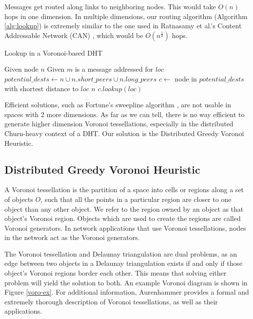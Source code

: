 Messages get routed along links to neighboring nodes.
This would take $O(n)$ hops in one dimension.
In multiple dimensions, our routing algorithm (Algorithm \ref{alg:lookup}) is extremely similar to the one used in Ratnasamy et al.'s Content Addressable Network (CAN) \cite{can}, which would be $O(n^{\frac{1}{d}})$ hops.


\begin{algorithm}
	\caption{Lookup in a Voronoi-based DHT}
	\label{alg:lookup}
	\begin{algorithmic}[1]
		\State Given node $n$
		\State Given $m$ is a message addressed for $loc$
		\State $potential\_dests \leftarrow n \cup n.short\_peers \cup n.long\_peers$
		\State $c \leftarrow $ node in $ potential\_dests$ with shortest distance to $loc$
			\State \Return $n$
		\Else
			\State \Return $c.lookup(loc)$
		\EndIf
	\end{algorithmic}
\end{algorithm}


Efficient solutions, such as Fortune's sweepline algorithm \cite{fortune1987sweepline}, are not usable in spaces with 2 more dimensions.
As far as we can tell, there is no way efficient to generate higher dimension Voronoi tessellations, especially in the distributed Churn-heavy context of a DHT.
Our solution is the Distributed Greedy Voronoi Heuristic.

\subsection*{Distributed Greedy Voronoi Heuristic}
A Voronoi tessellation is the partition of a space into cells or regions along a set of objects $O$, such that all the points in a particular region are closer to one object than any other object.
We refer to the region owned by an object as that object's Voronoi region.
Objects which are used to create the regions are called Voronoi generators.
In network applications that use Voronoi tessellations, nodes in the network act as the Voronoi generators.

The Voronoi tessellation and Delaunay triangulation are dual problems, as an edge between two objects in a Delaunay triangulation exists if and only if those object's Voronoi regions border each other.
This means that solving either problem will yield the solution to both.
An example Voronoi diagram is shown in Figure \ref{voro-ex}.
For additional information, Aurenhammer \cite{voronoi} provides a formal and extremely thorough description of Voronoi tessellations, as well as their applications.


